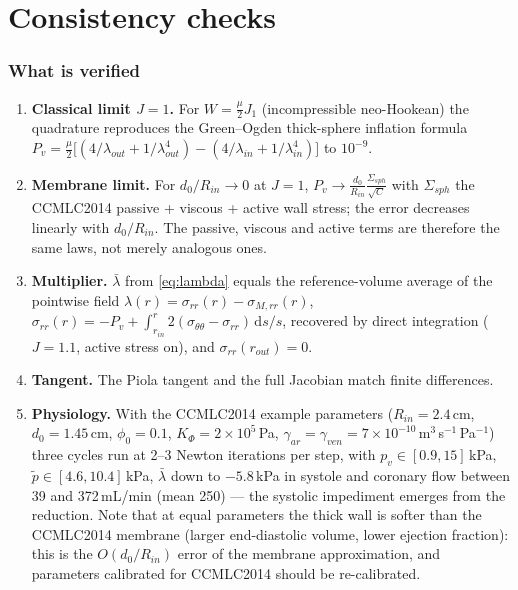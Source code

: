 \documentclass[11pt,a4paper]{article}
\newcommand{\dd}{\mathrm d}
\newcommand{\Rin}{R_{in}}
\newcommand{\rin}{r_{in}}
\newcommand{\lb}{\bar\lambda}
\newcommand{\pf}{\tilde p}
\begin{document}
\part{Consistency checks}

\section{What is verified}

\begin{enumerate}[leftmargin=2em]
\item \textbf{Classical limit $J=1$.} For $W=\tfrac\mu2 J_1$ (incompressible neo-Hookean) the quadrature reproduces the Green--Ogden thick-sphere inflation formula
$P_v=\tfrac\mu2\big[(4/\lambda_{out}+1/\lambda_{out}^4)-(4/\lambda_{in}+1/\lambda_{in}^4)\big]$ to $10^{-9}$.
\item \textbf{Membrane limit.} For $d_0/\Rin\to0$ at $J=1$, $P_v\to\frac{d_0}{\Rin}\frac{\Sigma_{sph}}{\sqrt C}$ with $\Sigma_{sph}$ the CCMLC2014 passive + viscous + active wall stress; the error decreases linearly with $d_0/\Rin$. The passive, viscous and active terms are therefore the same laws, not merely analogous ones.
\item \textbf{Multiplier.} $\lb$ from \eqref{eq:lambda} equals the reference-volume average of the pointwise field $\lambda(r)=\sigma_{rr}(r)-\sigma_{M,rr}(r)$, $\sigma_{rr}(r)=-P_v+\int_{\rin}^r2(\sigma_{\theta\theta}-\sigma_{rr})\,\dd s/s$, recovered by direct integration ($J=1.1$, active stress on), and $\sigma_{rr}(r_{out})=0$.
\item \textbf{Tangent.} The Piola tangent and the full Jacobian match finite differences.
\item \textbf{Physiology.} With the CCMLC2014 example parameters ($\Rin=2.4$\,cm, $d_0=1.45$\,cm, $\phi_0=0.1$, $K_\Phi=2\times10^5$\,Pa, $\gamma_{ar}=\gamma_{ven}=7\times10^{-10}$\,m$^3$\,s$^{-1}$\,Pa$^{-1}$) three cycles run at 2--3 Newton iterations per step, with $p_v\in[0.9,15]$\,kPa, $\pf\in[4.6,10.4]$\,kPa, $\lb$ down to $-5.8$\,kPa in systole and coronary flow between 39 and 372\,mL/min (mean 250) --- the systolic impediment emerges from the reduction. Note that at equal parameters the thick wall is softer than the CCMLC2014 membrane (larger end-diastolic volume, lower ejection fraction): this is the $O(d_0/\Rin)$ error of the membrane approximation, and parameters calibrated for CCMLC2014 should be re-calibrated.
\end{enumerate}
\end{document}
